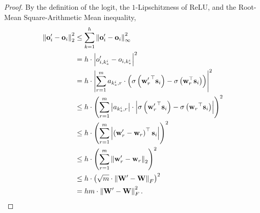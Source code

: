 \documentclass[10pt]{article}
\def\rvo{{\mathbf{o}}}
\def\rvs{{\mathbf{s}}}
\def\rvw{{\mathbf{w}}}
\def\rvo{{\mathbf{o}}}
\def\rmW{{\mathbf{W}}}
\begin{document}
\begin{proof}
By the definition of the logit, the $1$-Lipschitzness of ReLU, and the Root-Mean Square-Arithmetic Mean inequality,
\begin{equation*}
\begin{split}
    \left\| \rvo_i^\prime - \rvo_i \right\|_2^2 &\le \sum\limits_{k = 1}^{h}{ \left\| \rvo_i^\prime - \rvo_i \right\|_\infty^2} \\
    &= h \cdot \left| o_{i,k_*^i}^\prime - o_{i,k_*^i} \right|^2 \\
    &= h \cdot \left| \sum\limits_{r=1}^{m}{ a_{k_*^i,r} \cdot \left( \sigma\left({\rvw_r^\prime}^\top \rvs_i \right) - \sigma\left(\rvw_r^\top \rvs_i \right) \right)} \right|^2 \\
    &\le h \cdot \left( \sum\limits_{r=1}^{m}{ \left| a_{k_*^i,r} \right| \cdot \left| \sigma\left({\rvw_r^\prime}^\top \rvs_i\right) - \sigma\left({\rvw_r}^\top \rvs_i\right) \right|  } \right)^2 \\
    &\le h \cdot \left( \sum\limits_{r=1}^{m}{ \left| \left({\rvw_r^\prime} - \rvw_r \right)^\top \rvs_i\right|  } \right)^2 \\
    &\le h \cdot \left( \sum\limits_{r=1}^{m}{ \left\| {\rvw_r^\prime} - \rvw_r \right\|_2  } \right)^2 \\
    &\le h \cdot \left( \sqrt{m} \cdot \left\| \rmW^\prime - \rmW \right\|_F \right)^2 \\
    &= h m \cdot \left\| \rmW^\prime - \rmW \right\|_F^2. \qedhere
\end{split}
\end{equation*}
\end{proof}
\end{document}
